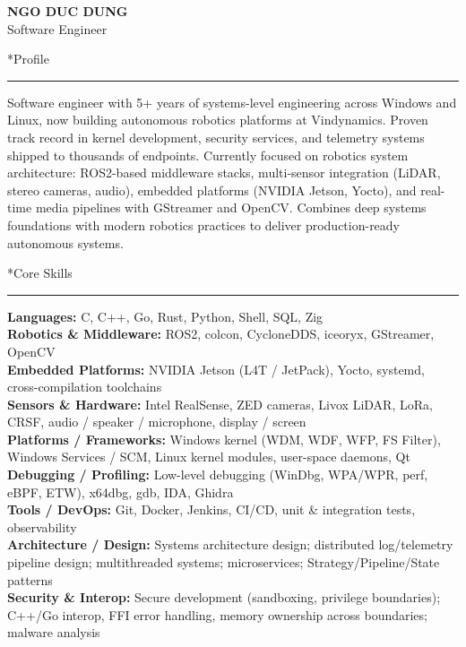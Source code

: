 \documentclass[10pt]{article}
\makeatletter
\renewcommand{\section}{%
  \@startsection{section}{1}{0pt}{0.6ex}{0.2ex}%
  {\normalsize\bfseries}}
\newcommand{\sectionrule}{%
  \par\vspace{-0.4em}%
  {\centering\rule{\linewidth}{0.4pt}\par}%
  \vspace{0.1em}%
}
\makeatother
\begin{document}
\small\raggedright
\setlength{\labelsep}{2pt}
\setlength{\itemindent}{0pt}
\setlength{\leftmargini}{0.8em}
\setlength{\topskip}{0pt}
\setlength{\partopsep}{0pt}
\setlength{\parsep}{0pt}
\setlength{\itemsep}{0pt}
\setlength{\topsep}{0pt}

\begin{center}
  {\Large\bfseries NGO DUC DUNG}\\[0pt]
  {\normalsize Software Engineer}
\end{center}
\vspace{6pt}

\section*{Profile}\sectionrule
\noindent
Software engineer with 5+ years of systems-level engineering across Windows and Linux, now building autonomous robotics platforms at Vindynamics. Proven track record in kernel development, security services, and telemetry systems shipped to thousands of endpoints. Currently focused on robotics system architecture: ROS2-based middleware stacks, multi-sensor integration (LiDAR, stereo cameras, audio), embedded platforms (NVIDIA Jetson, Yocto), and real-time media pipelines with GStreamer and OpenCV. Combines deep systems foundations with modern robotics practices to deliver production-ready autonomous systems.

\section*{Core Skills}\sectionrule
\noindent
\textbf{Languages:} C, C++, Go, Rust, Python, Shell, SQL, Zig\\
\textbf{Robotics \& Middleware:} ROS2, colcon, CycloneDDS, iceoryx, GStreamer, OpenCV\\
\textbf{Embedded Platforms:} NVIDIA Jetson (L4T / JetPack), Yocto, systemd, cross-compilation toolchains\\
\textbf{Sensors \& Hardware:} Intel RealSense, ZED cameras, Livox LiDAR, LoRa, CRSF, audio / speaker / microphone, display / screen\\
\textbf{Platforms / Frameworks:} Windows kernel (WDM, WDF, WFP, FS Filter), Windows Services / SCM, Linux kernel modules, user-space daemons, Qt\\
\textbf{Debugging / Profiling:} Low-level debugging (WinDbg, WPA/WPR, perf, eBPF, ETW), x64dbg, gdb, IDA, Ghidra\\
\textbf{Tools / DevOps:} Git, Docker, Jenkins, CI/CD, unit \& integration tests, observability\\
\textbf{Architecture / Design:} Systems architecture design; distributed log/telemetry pipeline design; multithreaded systems; microservices; Strategy/Pipeline/State patterns\\
\textbf{Security \& Interop:} Secure development (sandboxing, privilege boundaries); C++/Go interop, FFI error handling, memory ownership across boundaries; malware analysis
\end{document}
